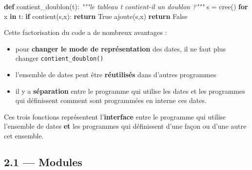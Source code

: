 \documentclass[a4paper,17pt]{extarticle}
\providecommand{\tightlist}{%
      \setlength{\itemsep}{0pt}\setlength{\parskip}{0pt}}
\newenvironment{Shaded}{}{}
\newcommand{\KeywordTok}[1]{\textcolor[rgb]{0.00,0.44,0.13}{\textbf{{#1}}}}
\newcommand{\CommentTok}[1]{\textcolor[rgb]{0.38,0.63,0.69}{\textit{{#1}}}}
\newcommand{\NormalTok}[1]{{#1}}
\newcommand{\VariableTok}[1]{\textcolor[rgb]{0.10,0.09,0.49}{{#1}}}
\newcommand{\ControlFlowTok}[1]{\textcolor[rgb]{0.00,0.44,0.13}{\textbf{{#1}}}}
\newcommand{\OperatorTok}[1]{\textcolor[rgb]{0.40,0.40,0.40}{{#1}}}
\begin{document}
\begin{Shaded}
\begin{Highlighting}[]
\KeywordTok{def}\NormalTok{ contient\_doublon(t):}
    \CommentTok{"""le tableau t contient{-}il un doublon ?"""}
\NormalTok{    s }\OperatorTok{=}\NormalTok{ cree()}
    \ControlFlowTok{for}\NormalTok{ x }\KeywordTok{in}\NormalTok{ t:}
        \ControlFlowTok{if}\NormalTok{ contient(s,x):}
            \ControlFlowTok{return} \VariableTok{True}
\NormalTok{        ajoute(s,x)}
    \ControlFlowTok{return} \VariableTok{False}
\end{Highlighting}
\end{Shaded}
\begin{remarque}
    Cette factorisation du code a de nombreux avantages :

\begin{itemize}
\tightlist
\item
  pour \textbf{changer le mode de représentation} des dates, il ne faut
  plus changer \texttt{contient\_doublon()}
\item
  l'ensemble de dates peut être \textbf{réutilisés} dans d'autres
  programmes
\item
  il y a \textbf{séparation} entre le programme qui utilise les dates et
  les programmes qui définissent comment sont programmées en interne ces
  dates.
\end{itemize}

Ces trois fonctions représentent l'\textbf{interface} entre le programme
qui utilise l'ensemble de dates \textbf{et} les programmes qui
définissent d'une façon ou d'une autre cet ensemble.

        \end{remarque}
    \hypertarget{modules}{%
\subsection{2.1 --- Modules}\label{modules}}
\end{document}
